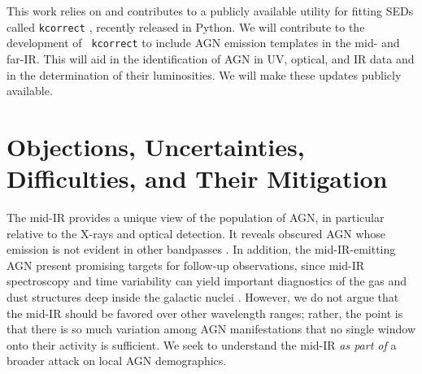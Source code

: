 \documentclass[12pt, preprint]{hacked-aastex}
\begin{document}
This work relies on and contributes to a publicly available utility
for fitting SEDs called {\tt kcorrect} \cite{blanton06b}, recently
released in Python.  We will contribute to the development of {\tt
  kcorrect} to include AGN emission templates in the mid- and far-IR.
This will aid in the identification of AGN in UV, optical, and IR data
and in the determination of their luminosities. We will make these
updates publicly available.


\section{Objections, Uncertainties, Difficulties, and Their Mitigation}
\label{sec:difficulties}


 The mid-IR provides a unique
view of the population of AGN, in particular relative to the X-rays
and optical detection. It reveals obscured AGN whose emission is not
evident in other bandpasses \cite{sajina22a}. In addition, the
mid-IR-emitting AGN present promising targets for follow-up
observations, since mid-IR spectroscopy and time variability can yield
important diagnostics of the gas and dust structures deep inside the
galactic nuclei \cite{goold23a}. However, we do not argue that the
mid-IR should be favored over other wavelength ranges; rather, the
point is that there is so much variation among AGN manifestations that
no single window onto their activity is sufficient. We seek to
understand the mid-IR {\it as part of} a broader attack on local AGN
demographics.
\end{document}
